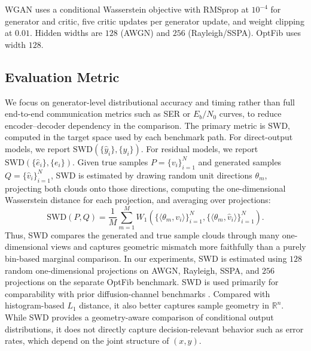 \documentclass[conference]{IEEEtran}
\begin{document}
WGAN uses a conditional Wasserstein objective with RMSprop at \(10^{-4}\) for generator and critic, five critic updates per generator update, and weight clipping at \(0.01\). Hidden widths are \(128\) (AWGN) and \(256\) (Rayleigh/SSPA). OptFib uses width \(128\). %

%


\subsection{Evaluation Metric}
We focus on generator-level distributional accuracy and timing rather than full end-to-end communication metrics such as SER or \(E_b/N_0\) curves, to reduce encoder--decoder dependency in the comparison.
The primary metric is SWD, computed in the target space used by each benchmark path.
For direct-output models, we report \(\mathrm{SWD}\!\left(\{\hat{y}_i\}, \{y_i\}\right)\). For residual models, we report \(\mathrm{SWD}\!\left(\{\hat{e}_i\}, \{e_i\}\right)\).
Given true samples \(P=\{v_i\}_{i=1}^N\) and generated samples \(Q=\{\hat v_i\}_{i=1}^N\), SWD is estimated by drawing random unit directions \(\theta_m\), projecting both clouds onto those directions, computing the one-dimensional Wasserstein distance for each projection, and averaging over projections:
\begin{equation*}
\mathrm{SWD}(P,Q)
=
\frac{1}{M}
\sum_{m=1}^M
W_1\!\left(\{\langle \theta_m,v_i\rangle\}_{i=1}^N,\{\langle \theta_m,\hat v_i\rangle\}_{i=1}^N\right).
\end{equation*}
Thus, SWD compares the generated and true sample clouds through many one-dimensional views and captures geometric mismatch more faithfully than a purely bin-based marginal comparison. In our experiments, SWD is estimated using \(128\) random one-dimensional projections on AWGN,
  Rayleigh, SSPA, and \(256\) projections on the separate OptFib benchmark.
SWD is used primarily for comparability with prior diffusion-channel benchmarks \cite{paper2309,kimicc2024}. Compared with histogram-based \(L_1\) distance, it also better captures sample geometry in \(\mathbb{R}^n\). While SWD provides a geometry-aware comparison of conditional output distributions, it does not directly capture decision-relevant behavior such as error rates, which depend on the joint structure of $(x,y)$.
\end{document}
